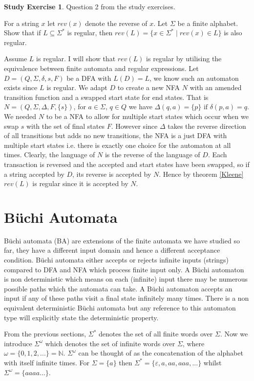 \documentclass[a4paper,12pt]{report}
\theoremstyle{definition}
\newtheorem{exercise}{Study Exercise}[]
\begin{document}
\begin{exercise}
Question 2 from the study exercises.

For a string $x$ let $rev(x)$ denote the reverse of $x$. Let $\Sigma$ be a finite alphabet. Show that if $L\subseteq\Sigma^*$ is regular, then $rev(L) = \{x\in\Sigma^*\mid rev(x)\in L\}$ is also regular. 

Assume $L$ is regular. I will show that $rev(L)$ is regular by utilising the equivalence between finite automata and regular expressions. 
Let $D=(Q,\Sigma, \delta, s, F) $ be a DFA with $L(D)=L$, we know such an automaton exists since $L$ is regular. We adapt $D$ to create a new NFA $N$ with an amended transition function and a swapped start state for end states. That is $N=(Q,\Sigma, \Delta, F, \{s\})$,  for $a\in\Sigma$, $q\in Q$ we have $\Delta(q,a)=\{p \}\text{ if } \delta(p,a)=q$. 
We needed $N$ to be a NFA to allow for multiple start states which occur when we swap $s$ with the set of final states $F$. However since $\Delta$ takes the reverse direction of all transitions but adds no new transitions, the NFA is a just DFA with multiple start states i.e. there is exactly one choice for the automaton at all times. Clearly, the language of $N$ is the reverse of the language of $D$. Each transaction is reversed and the accepted and start states have been swapped, so if a string accepted by $D$, its reverse is accepted by $N$. Hence by theorem \ref{Kleene}  $rev(L)$ is regular since it is accepted by $N$. 
\end{exercise}

\chapter{Büchi Automata}
Büchi automata (BA) are extensions of the finite automata we have studied so far, they have a different input domain and hence a different acceptance condition. Büchi automata either accepts or rejects infinite inputs (strings) compared to DFA and NFA which process finite input only. A Büchi automaton is non deterministic which means on each (infinite) input there may be numerous possible paths which the automata can take. A Büchi automaton accepts an input if any of these paths visit a final state infinitely many times. There is a non equivalent deterministic Büchi automata but any reference to this automaton type will explicitly state the deterministic property.



From the previous sections, $\Sigma^*$ denotes the set of all finite words over $\Sigma$. Now we introduce $\Sigma^\omega$ which denotes the set of infinite words over $\Sigma$, where $\omega=\{0,1,2,...\}=\mathbb{N}$. $\Sigma^\omega$ can be thought of as the concatenation of the alphabet with itself infinite times. For $\Sigma=\{a\}$ then $\Sigma^*=\{\varepsilon, a, aa, aaa, ...\}$ whilst $\Sigma^\omega=\{aaaa...\}$.
\end{document}
